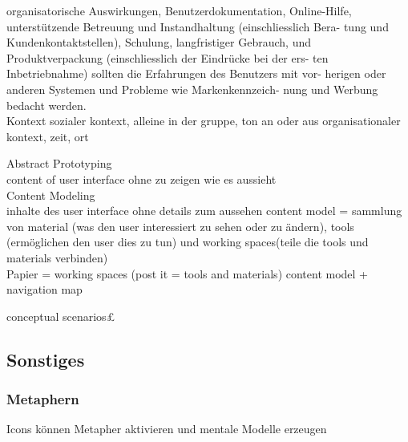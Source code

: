  organisatorische Auswirkungen, Benutzerdokumentation, Online-Hilfe, unterstützende Betreuung und Instandhaltung (einschliesslich Bera- tung und Kundenkontaktstellen), Schulung, langfristiger Gebrauch, und Produktverpackung (einschliesslich der Eindrücke bei der ers- ten Inbetriebnahme) sollten die Erfahrungen des Benutzers mit vor- herigen oder anderen Systemen und Probleme wie Markenkennzeich- nung und Werbung bedacht werden.\\

 Kontext sozialer kontext, alleine in der gruppe, ton an oder aus
 organisationaler kontext, zeit, ort

 Abstract Prototyping\\
 content of user interface ohne zu zeigen wie es aussieht\\

 Content Modeling \\
 inhalte des user interface ohne details zum aussehen
 content model = sammlung von material (was den user interessiert zu sehen oder zu ändern), tools (ermöglichen den user dies zu tun) und working spaces(teile die tools und materials verbinden)\\

 Papier = working spaces (post it = tools and materials)
 content model + navigation map

 conceptual scenarios£

\subsection{Sonstiges}

\subsubsection{Metaphern}
Icons können Metapher aktivieren und mentale Modelle erzeugen

